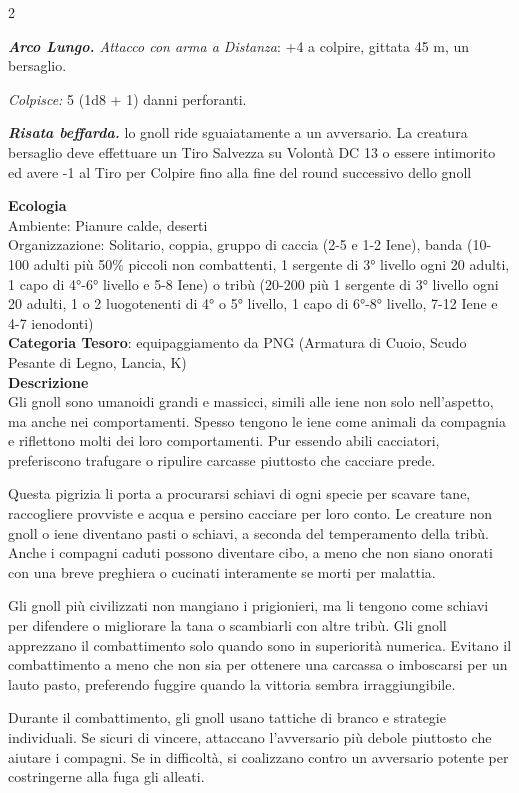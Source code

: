 \begin{multicols}{2}
{\emph{\textbf{Arco Lungo.} Attacco con arma a Distanza}: +4 a colpire, gittata 45 m, un bersaglio.

\emph{Colpisce:} 5 (1d8 + 1) danni perforanti.

\emph{\textbf{Risata beffarda.}} lo gnoll ride sguaiatamente a un avversario. La creatura bersaglio deve effettuare un Tiro Salvezza su Volontà DC 13 o essere intimorito ed avere -1 al Tiro per Colpire fino alla fine del round successivo dello gnoll

\textbf{Ecologia}\\
Ambiente: Pianure calde, deserti\\
Organizzazione: Solitario, coppia, gruppo di caccia (2-5 e 1-2 Iene), banda (10-100 adulti più 50\% piccoli non combattenti, 1 sergente di 3° livello ogni 20 adulti, 1 capo di 4°-6° livello e 5-8 Iene) o tribù (20-200 più 1 sergente di 3° livello ogni 20 adulti, 1 o 2 luogotenenti di 4° o 5° livello, 1 capo di 6°-8° livello, 7-12 Iene e 4-7 ienodonti)\\
\textbf{Categoria Tesoro}: equipaggiamento da PNG (Armatura di Cuoio, Scudo Pesante di Legno, Lancia, K)\\
\textbf{Descrizione}\\
Gli gnoll sono umanoidi grandi e massicci, simili alle iene non solo nell'aspetto, ma anche nei comportamenti. Spesso tengono le iene come animali da compagnia e riflettono molti dei loro comportamenti. Pur essendo abili cacciatori, preferiscono trafugare o ripulire carcasse piuttosto che cacciare prede.

Questa pigrizia li porta a procurarsi schiavi di ogni specie per scavare tane, raccogliere provviste e acqua e persino cacciare per loro conto. Le creature non gnoll o iene diventano pasti o schiavi, a seconda del temperamento della tribù. Anche i compagni caduti possono diventare cibo, a meno che non siano onorati con una breve preghiera o cucinati interamente se morti per malattia.

Gli gnoll più civilizzati non mangiano i prigionieri, ma li tengono come schiavi per difendere o migliorare la tana o scambiarli con altre tribù. Gli gnoll apprezzano il combattimento solo quando sono in superiorità numerica. Evitano il combattimento a meno che non sia per ottenere una carcassa o imboscarsi per un lauto pasto, preferendo fuggire quando la vittoria sembra irraggiungibile.

Durante il combattimento, gli gnoll usano tattiche di branco e strategie individuali. Se sicuri di vincere, attaccano l'avversario più debole piuttosto che aiutare i compagni. Se in difficoltà, si coalizzano contro un avversario potente per costringerne alla fuga gli alleati.

}
\end{multicols}
